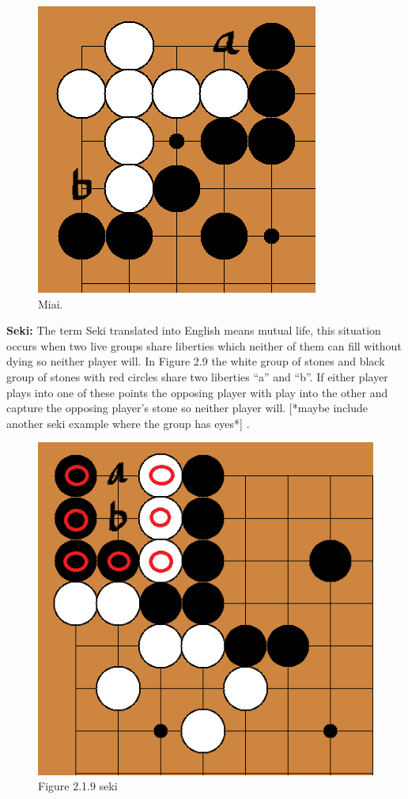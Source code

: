 \documentclass{l3proj}
\begin{document}
\begin{figure}[H]
\centering
\includegraphics[scale=0.5]{Images/miai.png}
\caption{Miai.}
\end{figure}

\textbf{Seki:} The term Seki translated into English means mutual life, this situation occurs when two live groups share liberties which neither of them can fill without dying so neither player will.
 In Figure 2.9 the white group of stones and black group of stones with red circles share two liberties “a” and “b”. If either player plays into one of these points the opposing player with play into the other and capture the opposing player’s stone so neither player will. [*maybe include another seki example where the group has eyes*] .

\begin{figure}[H]
\centering
\includegraphics[scale=0.5]{Images/seki.png}
\caption{Figure 2.1.9 seki}
\end{figure}
\end{document}
